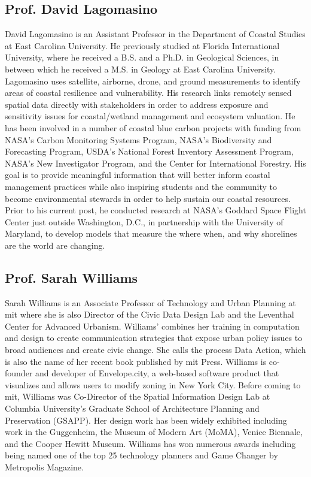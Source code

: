 \documentclass[notitlepage]{article}
\begin{document}
\subsection*{Prof. David Lagomasino}

David Lagomasino is an Assistant Professor in the Department of Coastal Studies at East Carolina University. He previously studied at Florida International University, where he received a B.S. and a Ph.D. in Geological Sciences, in between which he received a M.S. in Geology at East Carolina University. Lagomasino uses satellite, airborne, drone, and ground measurements to identify areas of coastal resilience and vulnerability. His research links remotely sensed spatial data directly with stakeholders in order to address exposure and sensitivity issues for coastal/wetland management and ecosystem valuation. He has been involved in a number of  coastal blue carbon projects with funding from NASA’s Carbon Monitoring Systems Program,  NASA’s Biodiversity and Forecasting Program, USDA’s National Forest Inventory Assessment Program,  NASA’s New Investigator Program, and the Center for International Forestry. His goal is to provide meaningful information that will better inform coastal management practices while also inspiring students and the community to become environmental stewards in order to help sustain our coastal resources. Prior to his current post, he conducted research at NASA’s Goddard Space Flight Center just outside Washington, D.C., in partnership with the University of Maryland, to develop models that measure the where when, and why shorelines are the world are changing.

\subsection*{Prof. Sarah Williams}

Sarah Williams is an Associate Professor of Technology and Urban Planning at \ac{mit} where she is also Director of the Civic Data Design Lab and the Leventhal Center for Advanced Urbanism. Williams’ combines her training in computation and design to create communication strategies that expose urban policy issues to broad audiences and create civic change. She calls the process Data Action, which is also the name of her recent book published by \ac{mit} Press. Williams is co-founder and developer of Envelope.city, a web-based software product that visualizes and allows users to modify zoning in New York City.  Before coming to \ac{mit}, Williams was Co-Director of the Spatial Information Design Lab at Columbia University’s Graduate School of Architecture Planning and Preservation (GSAPP). Her design work has been widely exhibited including work in the Guggenheim, the Museum of Modern Art (MoMA), Venice Biennale, and the Cooper Hewitt Museum. Williams has won numerous awards including being named one of the top 25 technology planners and Game Changer by Metropolis Magazine. 
\end{document}
